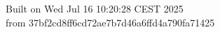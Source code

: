{\noindent Built on Wed Jul 16 10:20:28 CEST 2025} \\ 
 {\noindent from 37bf2cd8ff6cd72ae7b7d46a6ffd4a790fa71425}
